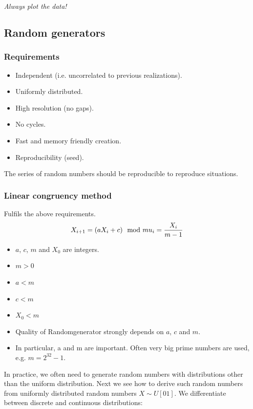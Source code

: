 \emph{Always plot the data!}

\subsection{Random generators}

\subsubsection{Requirements}

\begin{itemize}
	\tightlist
	\item Independent (i.e. uncorrelated to previous realizations).
	\item Uniformly distributed.
	\item High resolution (no gaps).
	\item No cycles.
	\item Fast and memory friendly creation.
	\item Reproducibility (seed).
\end{itemize}

The series of random numbers should be reproducible to reproduce
situations.

\subsubsection{Linear congruency method}

Fulfils the above requirements.
\begin{equation}
X_{i+1} = (aX_i+c) \mod m\\
u_i = \frac{X_i}{m-1}
\end{equation}

\begin{itemize}
	\tightlist
	\item $a$, $c$, $m$ and $X_0$ are integers.
	\item $m > 0$
	\item $a < m$
	\item $c < m$
	\item $X_0 < m$
	\item Quality of Randomgenerator strongly depends on $a$, $c$ and $m$.
	\item In particular, a and m are important. Often very big prime numbers
	are used, e.g. $m=2^{32} -1$.
\end{itemize}

In practice, we often need to generate random numbers with distributions
other than the uniform distribution. Next we see how to derive such random
numbers from uniformly distributed random numbers $X \sim U[0 1]$.
We differentiate between discrete and continuous distributions:

